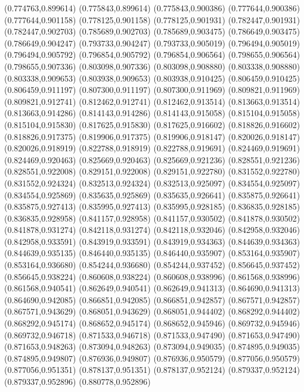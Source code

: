 (0.774763,0.899614)
(0.775843,0.899614)
(0.775843,0.900386)
(0.777644,0.900386)
(0.777644,0.901158)
(0.778125,0.901158)
(0.778125,0.901931)
(0.782447,0.901931)
(0.782447,0.902703)
(0.785689,0.902703)
(0.785689,0.903475)
(0.786649,0.903475)
(0.786649,0.904247)
(0.793733,0.904247)
(0.793733,0.905019)
(0.796494,0.905019)
(0.796494,0.905792)
(0.796854,0.905792)
(0.796854,0.906564)
(0.798655,0.906564)
(0.798655,0.907336)
(0.803098,0.907336)
(0.803098,0.908880)
(0.803338,0.908880)
(0.803338,0.909653)
(0.803938,0.909653)
(0.803938,0.910425)
(0.806459,0.910425)
(0.806459,0.911197)
(0.807300,0.911197)
(0.807300,0.911969)
(0.809821,0.911969)
(0.809821,0.912741)
(0.812462,0.912741)
(0.812462,0.913514)
(0.813663,0.913514)
(0.813663,0.914286)
(0.814143,0.914286)
(0.814143,0.915058)
(0.815104,0.915058)
(0.815104,0.915830)
(0.817625,0.915830)
(0.817625,0.916602)
(0.818826,0.916602)
(0.818826,0.917375)
(0.819906,0.917375)
(0.819906,0.918147)
(0.820026,0.918147)
(0.820026,0.918919)
(0.822788,0.918919)
(0.822788,0.919691)
(0.824469,0.919691)
(0.824469,0.920463)
(0.825669,0.920463)
(0.825669,0.921236)
(0.828551,0.921236)
(0.828551,0.922008)
(0.829151,0.922008)
(0.829151,0.922780)
(0.831552,0.922780)
(0.831552,0.924324)
(0.832513,0.924324)
(0.832513,0.925097)
(0.834554,0.925097)
(0.834554,0.925869)
(0.835635,0.925869)
(0.835635,0.926641)
(0.835875,0.926641)
(0.835875,0.927413)
(0.835995,0.927413)
(0.835995,0.928185)
(0.836835,0.928185)
(0.836835,0.928958)
(0.841157,0.928958)
(0.841157,0.930502)
(0.841878,0.930502)
(0.841878,0.931274)
(0.842118,0.931274)
(0.842118,0.932046)
(0.842958,0.932046)
(0.842958,0.933591)
(0.843919,0.933591)
(0.843919,0.934363)
(0.844639,0.934363)
(0.844639,0.935135)
(0.846440,0.935135)
(0.846440,0.935907)
(0.853164,0.935907)
(0.853164,0.936680)
(0.854244,0.936680)
(0.854244,0.937452)
(0.856645,0.937452)
(0.856645,0.938224)
(0.860608,0.938224)
(0.860608,0.938996)
(0.861568,0.938996)
(0.861568,0.940541)
(0.862649,0.940541)
(0.862649,0.941313)
(0.864690,0.941313)
(0.864690,0.942085)
(0.866851,0.942085)
(0.866851,0.942857)
(0.867571,0.942857)
(0.867571,0.943629)
(0.868051,0.943629)
(0.868051,0.944402)
(0.868292,0.944402)
(0.868292,0.945174)
(0.868652,0.945174)
(0.868652,0.945946)
(0.869732,0.945946)
(0.869732,0.946718)
(0.871533,0.946718)
(0.871533,0.947490)
(0.871653,0.947490)
(0.871653,0.948263)
(0.873094,0.948263)
(0.873094,0.949035)
(0.874895,0.949035)
(0.874895,0.949807)
(0.876936,0.949807)
(0.876936,0.950579)
(0.877056,0.950579)
(0.877056,0.951351)
(0.878137,0.951351)
(0.878137,0.952124)
(0.879337,0.952124)
(0.879337,0.952896)
(0.880778,0.952896)
